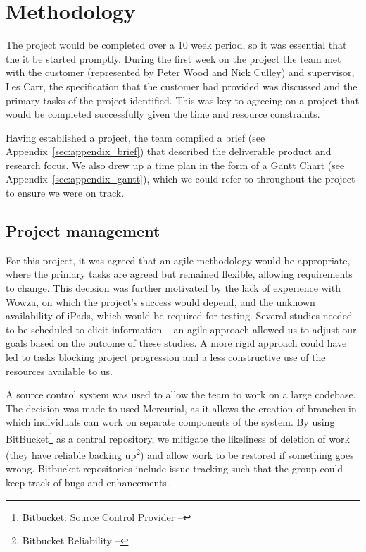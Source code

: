 \section{Methodology}

The project would be completed over a 10 week period, so it was essential that the it be started promptly. During the first week on the project the team met with the customer (represented by Peter Wood and Nick Culley) and supervisor, Les Carr, the specification that the customer had provided was discussed and the primary tasks of the project identified. This was key to agreeing on a project that would be completed successfully given the time and resource constraints.

Having established a project, the team compiled a brief (see Appendix~\ref{sec:appendix_brief}) that described the deliverable product and research focus. We also drew up a time plan in the form of a Gantt Chart (see Appendix~\ref{sec:appendix_gantt}), which we could refer to throughout the project to ensure we were on track.

\subsection{Project management}

For this project, it was agreed that an agile methodology would be appropriate, where the primary tasks are agreed but remained flexible, allowing requirements to change. This decision was further motivated by the lack of experience with Wowza, on which the project's success would depend, and the unknown availability of iPads, which would be required for testing. Several studies needed to be scheduled to elicit information -- an agile approach allowed us to adjust our goals based on the outcome of these studies. A more rigid approach could have led to tasks blocking project progression and a less constructive use of the resources available to us.

A source control system was used to allow the team to work on a large codebase. The decision was made to used Mercurial, as it allows the creation of branches in which individuals can work on separate components of the system. By using BitBucket\footnote{Bitbucket: Source Control Provider -- } as a central repository, we mitigate the likeliness of deletion of work (they have reliable backing up\footnote{Bitbucket Reliability -- }) and allow work to be restored if something goes wrong. Bitbucket repositories include issue tracking such that the group could keep track of bugs and enhancements.

